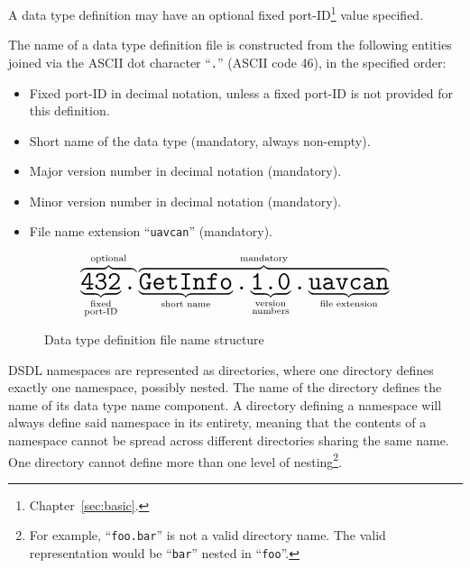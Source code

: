 A data type definition may have an optional fixed port-ID\footnote{Chapter~\ref{sec:basic}.} value specified.

The name of a data type definition file is constructed from the following entities
joined via the ASCII dot character ``\verb|.|'' (ASCII code 46), in the specified order:
\begin{itemize}
    \item Fixed port-ID in decimal notation, unless a fixed port-ID is not provided for this definition.
    \item Short name of the data type (mandatory, always non-empty).
    \item Major version number in decimal notation (mandatory).
    \item Minor version number in decimal notation (mandatory).
    \item File name extension ``\verb|uavcan|'' (mandatory).
\end{itemize}

\begin{figure}[H]
    $$
    \overbrace{%
        \underbrace{\texttt{\huge{432}}}_{\substack{\text{fixed} \\ \text{port-ID}}}%
        \texttt{\huge{.}}%
    }^{\text{optional}}%
    \overbrace{%
        \underbrace{\texttt{\huge{GetInfo}}}_{\substack{\text{short name}}}%
        \texttt{\huge{.}}%
        \underbrace{\texttt{\huge{1.0}}}_{\substack{\text{version} \\ \text{numbers}}}%
        \texttt{\huge{.}}%
        \underbrace{\texttt{\huge{uavcan}}}_{\text{file extension}}%
    }^{\text{mandatory}}
    $$
    \caption{Data type definition file name structure\label{fig:dsdl_definition_file_name_structure}}
\end{figure}

DSDL namespaces are represented as directories, where one directory defines exactly one namespace, possibly nested.
The name of the directory defines the name of its data type name component.
A directory defining a namespace will always define said namespace in its entirety,
meaning that the contents of a namespace cannot be spread across different directories sharing the same name.
One directory cannot define more than one level of
nesting\footnote{%
    For example, ``\texttt{foo.bar}'' is not a valid directory name.
    The valid representation would be ``\texttt{bar}'' nested in ``\texttt{foo}''.
}.

